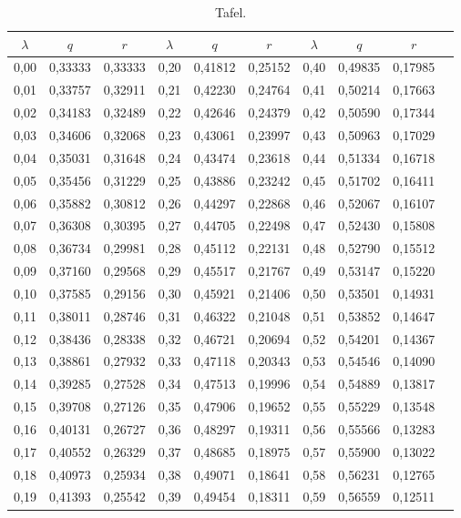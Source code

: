 \documentclass[12pt,a4paper]{article}
\begin{document}
\begin{table}[h]
\centering
\caption*{Tafel.}
\begin{tabular}{c@{\quad}c|c@{\quad}c|c@{\quad}c|c@{\quad}c|c@{\quad}c}
\toprule
$\lambda$ & $q$ & $r$ & $\lambda$ & $q$ & $r$ & $\lambda$ & $q$ & $r$ \\
\midrule
0{,}00 & 0{,}33333 & 0{,}33333 & 0{,}20 & 0{,}41812 & 0{,}25152 & 0{,}40 & 0{,}49835 & 0{,}17985 \\
0{,}01 & 0{,}33757 & 0{,}32911 & 0{,}21 & 0{,}42230 & 0{,}24764 & 0{,}41 & 0{,}50214 & 0{,}17663 \\
0{,}02 & 0{,}34183 & 0{,}32489 & 0{,}22 & 0{,}42646 & 0{,}24379 & 0{,}42 & 0{,}50590 & 0{,}17344 \\
0{,}03 & 0{,}34606 & 0{,}32068 & 0{,}23 & 0{,}43061 & 0{,}23997 & 0{,}43 & 0{,}50963 & 0{,}17029 \\
0{,}04 & 0{,}35031 & 0{,}31648 & 0{,}24 & 0{,}43474 & 0{,}23618 & 0{,}44 & 0{,}51334 & 0{,}16718 \\
0{,}05 & 0{,}35456 & 0{,}31229 & 0{,}25 & 0{,}43886 & 0{,}23242 & 0{,}45 & 0{,}51702 & 0{,}16411 \\
0{,}06 & 0{,}35882 & 0{,}30812 & 0{,}26 & 0{,}44297 & 0{,}22868 & 0{,}46 & 0{,}52067 & 0{,}16107 \\
0{,}07 & 0{,}36308 & 0{,}30395 & 0{,}27 & 0{,}44705 & 0{,}22498 & 0{,}47 & 0{,}52430 & 0{,}15808 \\
0{,}08 & 0{,}36734 & 0{,}29981 & 0{,}28 & 0{,}45112 & 0{,}22131 & 0{,}48 & 0{,}52790 & 0{,}15512 \\
0{,}09 & 0{,}37160 & 0{,}29568 & 0{,}29 & 0{,}45517 & 0{,}21767 & 0{,}49 & 0{,}53147 & 0{,}15220 \\
0{,}10 & 0{,}37585 & 0{,}29156 & 0{,}30 & 0{,}45921 & 0{,}21406 & 0{,}50 & 0{,}53501 & 0{,}14931 \\
0{,}11 & 0{,}38011 & 0{,}28746 & 0{,}31 & 0{,}46322 & 0{,}21048 & 0{,}51 & 0{,}53852 & 0{,}14647 \\
0{,}12 & 0{,}38436 & 0{,}28338 & 0{,}32 & 0{,}46721 & 0{,}20694 & 0{,}52 & 0{,}54201 & 0{,}14367 \\
0{,}13 & 0{,}38861 & 0{,}27932 & 0{,}33 & 0{,}47118 & 0{,}20343 & 0{,}53 & 0{,}54546 & 0{,}14090 \\
0{,}14 & 0{,}39285 & 0{,}27528 & 0{,}34 & 0{,}47513 & 0{,}19996 & 0{,}54 & 0{,}54889 & 0{,}13817 \\
0{,}15 & 0{,}39708 & 0{,}27126 & 0{,}35 & 0{,}47906 & 0{,}19652 & 0{,}55 & 0{,}55229 & 0{,}13548 \\
0{,}16 & 0{,}40131 & 0{,}26727 & 0{,}36 & 0{,}48297 & 0{,}19311 & 0{,}56 & 0{,}55566 & 0{,}13283 \\
0{,}17 & 0{,}40552 & 0{,}26329 & 0{,}37 & 0{,}48685 & 0{,}18975 & 0{,}57 & 0{,}55900 & 0{,}13022 \\
0{,}18 & 0{,}40973 & 0{,}25934 & 0{,}38 & 0{,}49071 & 0{,}18641 & 0{,}58 & 0{,}56231 & 0{,}12765 \\
0{,}19 & 0{,}41393 & 0{,}25542 & 0{,}39 & 0{,}49454 & 0{,}18311 & 0{,}59 & 0{,}56559 & 0{,}12511 \\
\bottomrule
\end{tabular}
\end{table}
\end{document}
